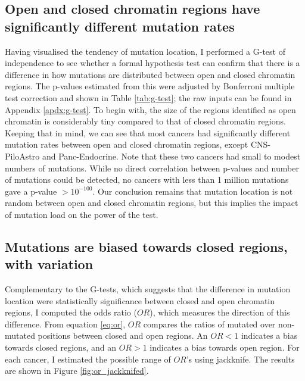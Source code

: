 

\subsection{Open and closed chromatin regions have significantly different mutation rates}
Having visualised the tendency of mutation location, I performed a G-test of independence to see whether a formal hypothesis test can confirm that there is a difference in how mutations are distributed between open and closed chromatin regions. The p-values estimated from this were adjusted by Bonferroni multiple test correction and shown in Table \ref{tab:g-test}; the raw inputs can be found in Appendix \ref{apdx:g-test}. To begin with, the size of the regions identified as open chromatin is considerably tiny compared to that of closed chromatin regions. Keeping that in mind, we can see that most cancers had significantly different mutation rates between open and closed chromatin regions, except CNS-PiloAstro and Panc-Endocrine. Note that these two cancers had small to modest numbers of mutations. While no direct correlation between p-values and number of mutations could be detected, no cancers with less than 1 million mutations gave a p-value $>10^{-100}$. Our conclusion remains that mutation location is not random between open and closed chromatin regions, but this implies the impact of mutation load on the power of the test. 



\subsection{Mutations are biased towards closed regions, with variation}
Complementary to the G-tests, which suggests that the difference in mutation location were statistically significance between closed and open chromatin regions, I computed the odds ratio ($OR$), which measures the direction of this difference. From equation \ref{eq:or}, $OR$ compares the ratios of mutated over non-mutated positions between closed and open regions. An $OR<1$ indicates a bias towards closed regions, and an $OR>1$ indicates a bias towards open region. For each cancer, I estimated the possible range of $OR$'s using jackknife. The results are shown in Figure \ref{fig:or_jackknifed}.



